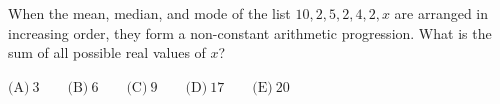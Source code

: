 When the mean, median, and mode of the list $10,2,5,2,4,2,x$ are arranged in increasing order, they form a non-constant arithmetic progression. What is the sum of all possible real values of $x$?



$\text{(A)}\ 3\qquad\text{(B)}\ 6 \qquad\text{(C)}\ 9 \qquad\text{(D)}\ 17\qquad\text{(E)}\ 20$
